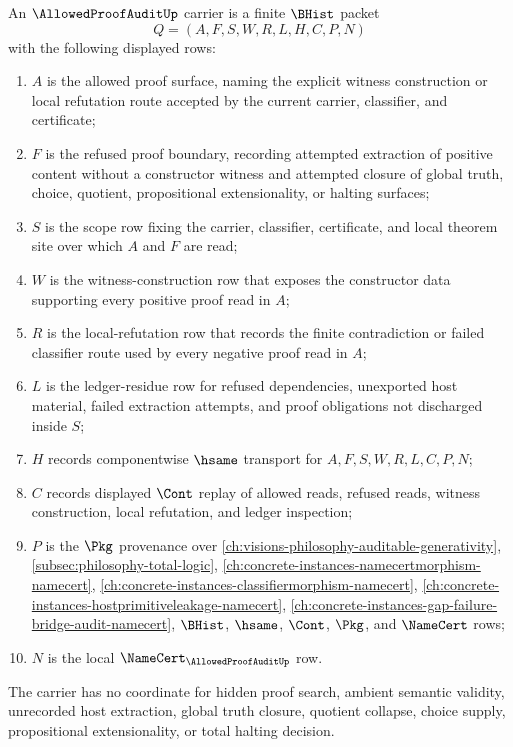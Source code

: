 \begin{definition}
\label{def:allowed-proof-audit-carrier}
An $\AllowedProofAuditUp$ carrier is a finite $\BHist$ packet
$$
Q=(A,F,S,W,R,L,H,C,P,N)
$$
with the following displayed rows:
\begin{enumerate}
\item $A$ is the allowed proof surface, naming the explicit witness construction or local refutation route accepted by the current carrier, classifier, and certificate;
\item $F$ is the refused proof boundary, recording attempted extraction of positive content without a constructor witness and attempted closure of global truth, choice, quotient, propositional extensionality, or halting surfaces;
\item $S$ is the scope row fixing the carrier, classifier, certificate, and local theorem site over which $A$ and $F$ are read;
\item $W$ is the witness-construction row that exposes the constructor data supporting every positive proof read in $A$;
\item $R$ is the local-refutation row that records the finite contradiction or failed classifier route used by every negative proof read in $A$;
\item $L$ is the ledger-residue row for refused dependencies, unexported host material, failed extraction attempts, and proof obligations not discharged inside $S$;
\item $H$ records componentwise $\hsame$ transport for $A,F,S,W,R,L,C,P,N$;
\item $C$ records displayed $\Cont$ replay of allowed reads, refused reads, witness construction, local refutation, and ledger inspection;
\item $P$ is the $\Pkg$ provenance over \autoref{ch:visions-philosophy-auditable-generativity}, \autoref{subsec:philosophy-total-logic}, \autoref{ch:concrete-instances-namecertmorphism-namecert}, \autoref{ch:concrete-instances-classifiermorphism-namecert}, \autoref{ch:concrete-instances-hostprimitiveleakage-namecert}, \autoref{ch:concrete-instances-gap-failure-bridge-audit-namecert}, $\BHist$, $\hsame$, $\Cont$, $\Pkg$, and $\NameCert$ rows;
\item $N$ is the local $\NameCert_{\AllowedProofAuditUp}$ row.
\end{enumerate}
The carrier has no coordinate for hidden proof search, ambient semantic validity, unrecorded host extraction, global truth closure, quotient collapse, choice supply, propositional extensionality, or total halting decision.
\end{definition}

